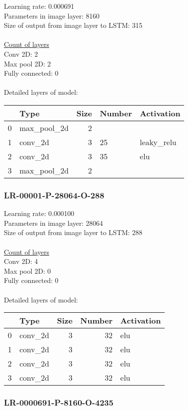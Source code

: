 Learning rate: 0.000691
\\Parameters in image layer: 8160
\\Size of output from image layer to LSTM: 315
\\\\\underline{Count of layers} 
\\Conv 2D:           2\\Max pool 2D:      2\\Fully connected:  0
\\\\Detailed layers of model: \\\begin{tabular}{rlrll}
\hline
    & Type        &   Size & Number   & Activation   \\
\hline
  0 & max\_pool\_2d &      2 &          &              \\
  1 & conv\_2d     &      3 & 25       & leaky\_relu   \\
  2 & conv\_2d     &      3 & 35       & elu          \\
  3 & max\_pool\_2d &      2 &          &              \\
\hline
\end{tabular}\subsubsection*{LR-00001-P-28064-O-288}
Learning rate: 0.000100
\\Parameters in image layer: 28064
\\Size of output from image layer to LSTM: 288
\\\\\underline{Count of layers} 
\\Conv 2D:           4\\Max pool 2D:      0\\Fully connected:  0
\\\\Detailed layers of model: \\\begin{tabular}{rlrrl}
\hline
    & Type    &   Size &   Number & Activation   \\
\hline
  0 & conv\_2d &      3 &       32 & elu          \\
  1 & conv\_2d &      3 &       32 & elu          \\
  2 & conv\_2d &      3 &       32 & elu          \\
  3 & conv\_2d &      3 &       32 & elu          \\
\hline
\end{tabular}\subsubsection*{LR-0000691-P-8160-O-4235}
